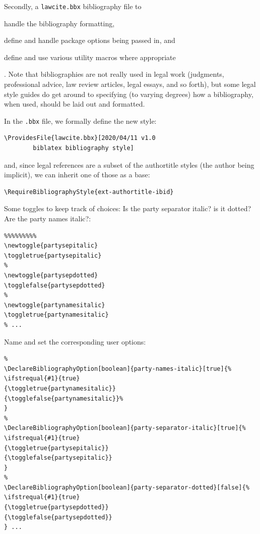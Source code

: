 
Secondly, a \verb|lawcite.bbx| bibliography file  to 
\begin{inparaenum}[\itshape (a)]
\item handle the bibliography formatting, \item define and handle package options being passed in, and \item define and use various utility macros where appropriate\end{inparaenum}. 
Note that bibliographies are not really used in legal work (judgments, professional advice, law review articles, legal essays, and so forth), but some legal style guides do get around to specifying (to varying degrees) how a bibliography, when used, should be laid out and formatted.

In the \verb|.bbx| file, we formally define the new style:

\begin{verbatim}
\ProvidesFile{lawcite.bbx}[2020/04/11 v1.0
        biblatex bibliography style]
\end{verbatim}

and, since legal references are a subset of the authortitle styles (the author being implicit), we can inherit one of those as a base:

\begin{verbatim}
\RequireBibliographyStyle{ext-authortitle-ibid}
\end{verbatim}

Some toggles to keep track of choices: Is the party separator italic? is it dotted? Are the party names italic?:

\begin{verbatim}
%%%%%%%%%
\newtoggle{partysepitalic}
\toggletrue{partysepitalic}
%
\newtoggle{partysepdotted}
\togglefalse{partysepdotted}
%
\newtoggle{partynamesitalic}
\toggletrue{partynamesitalic}
% ...
\end{verbatim}

Name and set the corresponding user options:

\begin{verbatim}
%
\DeclareBibliographyOption[boolean]{party-names-italic}[true]{%
\ifstrequal{#1}{true}
{\toggletrue{partynamesitalic}}
{\togglefalse{partynamesitalic}}%
}
%
\DeclareBibliographyOption[boolean]{party-separator-italic}[true]{%
\ifstrequal{#1}{true}
{\toggletrue{partysepitalic}}
{\togglefalse{partysepitalic}}
}
%
\DeclareBibliographyOption[boolean]{party-separator-dotted}[false]{%
\ifstrequal{#1}{true}
{\toggletrue{partysepdotted}}
{\togglefalse{partysepdotted}}
} ...
\end{verbatim}

